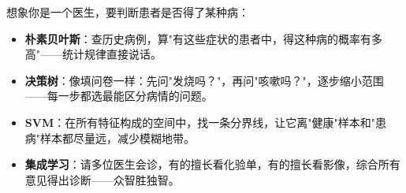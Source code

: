 \documentclass[a4paper,11pt]{ctexart}
\begin{document}
\begin{metaphorbox}
    想象你是一个医生，要判断患者是否得了某种病：
    \begin{itemize}
        \item \textbf{朴素贝叶斯}：查历史病例，算"有这些症状的患者中，得这种病的概率有多高"——统计规律直接说话。
        \item \textbf{决策树}：像填问卷一样：先问"发烧吗？"，再问"咳嗽吗？"，逐步缩小范围——每一步都选最能区分病情的问题。
        \item \textbf{SVM}：在所有特征构成的空间中，找一条分界线，让它离"健康"样本和"患病"样本都尽量远，减少模糊地带。
        \item \textbf{集成学习}：请多位医生会诊，有的擅长看化验单，有的擅长看影像，综合所有意见得出诊断——众智胜独智。
    \end{itemize}
\end{metaphorbox}
\end{document}
